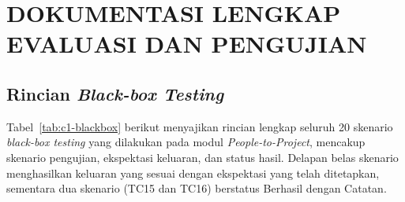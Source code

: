 \cleardoublepage
\chapter{DOKUMENTASI LENGKAP EVALUASI DAN PENGUJIAN}
\label{chap:lampiran-c}

\section{Rincian \emph{Black-box Testing}}
\label{sec:c-blackbox}

Tabel~\ref{tab:c1-blackbox} berikut menyajikan rincian lengkap seluruh 20 skenario \emph{black-box testing} yang dilakukan pada modul \emph{People-to-Project}, mencakup skenario pengujian, ekspektasi keluaran, dan status hasil. Delapan belas skenario menghasilkan keluaran yang sesuai dengan ekspektasi yang telah ditetapkan, sementara dua skenario (TC15 dan TC16) berstatus Berhasil dengan Catatan.

